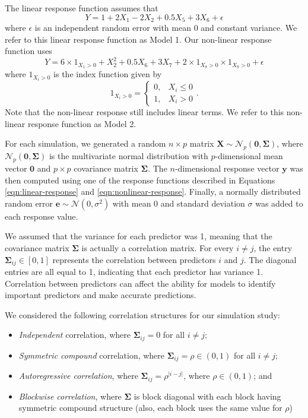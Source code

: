\documentclass{article}
\begin{document}
	The linear response function assumes that
	\begin{equation}\label{eqn:linear-response}
		Y = 1 + 2X_1 - 2X_2 + 0.5X_5 + 3X_6 + \epsilon
	\end{equation}
	where $\epsilon$ is an independent random error with mean 0 and constant variance. We refer to this linear response function as Model 1. Our non-linear response function uses
	\begin{equation}\label{eqn:nonlinear-response}
		Y = 6\times 1_{X_1 > 0} + X_2^2 + 0.5X_6 + 3X_7 + 2\times 1_{X_8 > 0}\times 1_{X_9>0} + \epsilon
	\end{equation}
	where $1_{X_i>0}$ is the index function given by
	\begin{equation}
		1_{X_i > 0} = \left\{\begin{array}{rl}
			0, & X_i \leq 0 \\
			1, & X_i > 0
		\end{array}\right..
	\end{equation}
	Note that the non-linear response still includes linear terms. We refer to this non-linear response function as Model 2.
	
	For each simulation, we generated a random $n\times p$ matrix $\mathbf{X}\sim \mathcal{N}_p(\mathbf{0}, \mathbf{\Sigma})$, where $\mathcal{N}_p(\mathbf{0}, \mathbf{\Sigma})$ is the multivariate normal distribution with $p$-dimensional mean vector $\mathbf{0}$ and $p \times p$ covariance matrix $\mathbf{\Sigma}$. The $n$-dimensional response vector $\mathbf{y}$ was then computed using one of the response functions described in Equations \ref{eqn:linear-response} and \ref{eqn:nonlinear-response}. Finally, a normally distributed random error $\mathbf{e}\sim \mathcal{N}(0, \sigma^2)$ with mean 0 and standard deviation $\sigma$ was added to each response value.
	
	We assumed that the variance for each predictor was 1, meaning that the covariance matrix $\mathbf{\Sigma}$ is actually a correlation matrix. For every $i \neq j$, the entry $\mathbf{\Sigma}_{ij}\in [0, 1]$ represents the correlation between predictors $i$ and $j$. The diagonal entries are all equal to 1, indicating that each predictor has variance 1. Correlation between predictors can affect the ability for models to identify important predictors and make accurate predictions.
	
	We considered the following correlation structures for our simulation study:
	\begin{itemize}\itemsep0pt
		\item \textit{Independent} correlation, where $\mathbf{\Sigma}_{ij} = 0$ for all $i \neq j$;
		\item \textit{Symmetric compound} correlation, where $\mathbf{\Sigma}_{ij} = \rho \in (0, 1)$ for all $i \neq j$;
		\item \textit{Autoregressive correlation}, where $\mathbf{\Sigma}_{ij} = \rho^{\vert i - j \vert}$, where $\rho \in (0, 1)$; and
		\item \textit{Blockwise correlation}, where $\mathbf{\Sigma}$ is block diagonal with each block having symmetric compound structure (also, each block uses the same value for $\rho$)
	\end{itemize}
	
\end{document}
